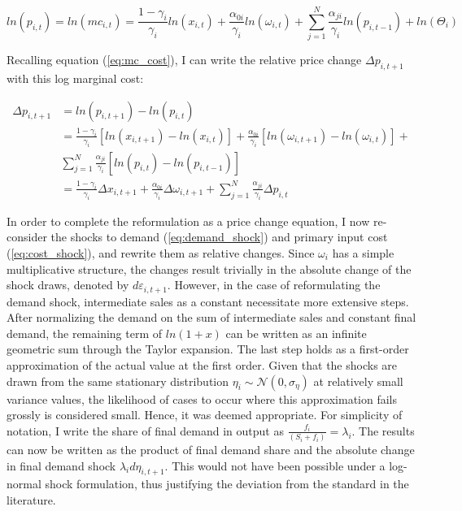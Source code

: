 \begin{equation} \label{eq:log_mc}
    ln(p_{i,t}) = ln(mc_{i,t}) = \frac{1-\gamma_i}{\gamma_i} ln(x_{i,t}) + \frac{\alpha_{0i}}{\gamma_i} ln(\omega_{i,t}) + \sum_{j=1}^N \frac{\alpha_{ji}}{\gamma_i} ln(p_{i,t-1}) + ln(\Theta_i)
\end{equation}

Recalling equation (\ref{eq:mc_cost}), I can write the relative price change $\Delta p_{i,t+1}$ with this log marginal cost:

\begin{equation}
    \begin{split}
        \Delta p_{i,t+1} &= ln(p_{i,t+1}) - ln(p_{i,t}) \\
        &= \frac{1-\gamma_i}{\gamma_i} [ln(x_{i,t+1}) - ln(x_{i,t})] + \frac{\alpha_{0i}}{\gamma_i} [ln(\omega_{i,t+1}) - ln(\omega_{i,t})] + \\ 
        & \sum_{j=1}^N \frac{\alpha_{ji}}{\gamma_i} [ln(p_{i,t}) - ln(p_{i,t-1})] \\
        &= \frac{1-\gamma_i}{\gamma_i} \Delta x_{i,t+1} + \frac{\alpha_{0i}}{\gamma_i} \Delta \omega_{i,t+1} + \sum_{j=1}^N \frac{\alpha_{ji}}{\gamma_i} \Delta p_{i,t} 
    \end{split}
\end{equation}

In order to complete the reformulation as a price change equation, I now re-consider the shocks to demand (\ref{eq:demand_shock}) and 
primary input cost (\ref{eq:cost_shock}), and rewrite them as relative changes. Since $\omega_i$ has a simple multiplicative structure, the 
changes result trivially in the absolute change of the shock draws, denoted by $d \varepsilon_{i,t+1}$. However, in the case of reformulating 
the demand shock, intermediate sales as a constant necessitate more extensive steps. After normalizing the demand on the sum of intermediate 
sales and constant final demand, the remaining term of $ln(1+x)$ can be written as an infinite geometric sum through the Taylor expansion. 
The last step holds as a first-order approximation of the actual value at the first order. Given that the shocks are drawn from the same stationary 
distribution $\eta_i \sim \mathcal{N}(0,\sigma_{\eta})$ at relatively small variance values, the likelihood of cases to occur where this
approximation fails grossly is considered small. Hence, it was deemed appropriate. For simplicity of notation, I write the share of final 
demand in output as $\frac{f_i}{(S_i+f_i)} = \lambda_i$. The results can now be written as the product of final demand share and the absolute 
change in final demand shock $\lambda_i d \eta_{i,t+1}$. This would not have been possible under a log-normal shock formulation, thus justifying 
the deviation from the standard in the literature. 

